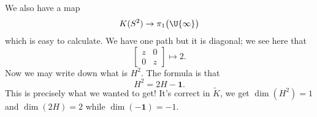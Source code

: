 We also have a map
\begin{equation}
K(S^{2})\to\pi_{1}\bigl(\U{\infty}\bigr)
\end{equation}
which is easy to calculate. We have one path but it is diagonal;
we see here that
\begin{equation}
\begin{bmatrix}z&0\\0&z
\end{bmatrix}\mapsto 2.
\end{equation}
Now we may write down what is $H^{2}$. The formula is that
\begin{equation}
H^{2}=2H-\mathbf{1}.
\end{equation}
This is precisely what we wanted to get! It's correct in
$\widetilde{K}$, we get $\dim(H^{2})=1$ and $\dim(2H)=2$ while
$\dim(-\mathbf{1})=-1$.


